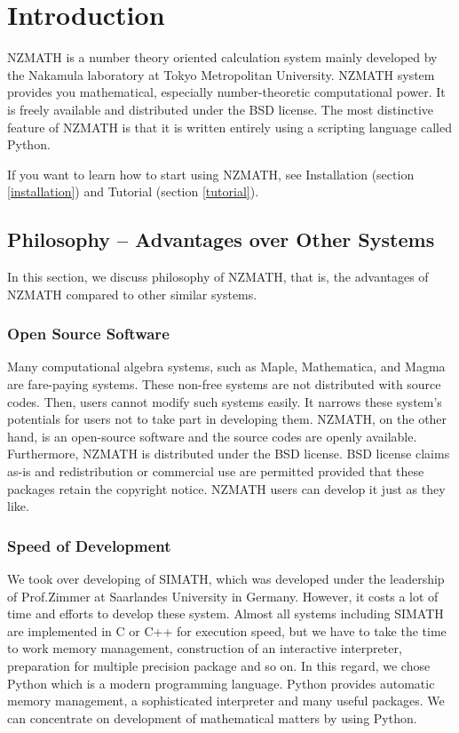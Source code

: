 

\section{Introduction}
 NZMATH\cite{NZMATH} is a number theory oriented calculation system 
mainly developed by the Nakamula laboratory at Tokyo Metropolitan University.
 NZMATH system provides you mathematical, especially number-theoretic computational power.
 It is freely available and distributed under the BSD license.
The most distinctive feature of NZMATH is that it is written entirely 
using a scripting language called Python.

If you want to learn how to start using NZMATH, 
see Installation (section \ref{installation}) and 
Tutorial (section \ref{tutorial}).
%
 \subsection{Philosophy -- Advantages over Other Systems}
 In this section, we discuss philosophy of NZMATH, that is, the advantages of 
NZMATH compared to other similar systems.
%
\subsubsection{Open Source Software}
%
Many computational algebra systems, such as Maple\cite{Maple}, 
Mathematica\cite{Mathematica}, and Magma\cite{Magma} are fare-paying systems.
These non-free systems are not distributed with source codes.
Then, users cannot modify such systems easily.
It narrows these system's potentials 
for users not to take part in developing them.
NZMATH, on the other hand, is an open-source software 
and the source codes are openly available.
Furthermore, NZMATH is distributed under the BSD license.
BSD license claims as-is and redistribution or commercial use are permitted 
provided that these packages retain the copyright notice.
NZMATH users can develop it just as they like.
%
\subsubsection{Speed of Development}
%
We took over developing of SIMATH\cite{SIMATH}, 
which was developed under the leadership of Prof.Zimmer 
at Saarlandes University in Germany.
However, it costs a lot of time and efforts to develop these system.
Almost all systems including SIMATH are 
implemented in C or C++ for execution speed,
but we have to take the time to work memory management, 
construction of an interactive interpreter, 
preparation for multiple precision package and so on.
In this regard, we chose Python which is a modern programming language.
Python provides automatic memory management, a sophisticated interpreter 
and many useful packages.
We can concentrate on development of mathematical matters by using Python.
%

